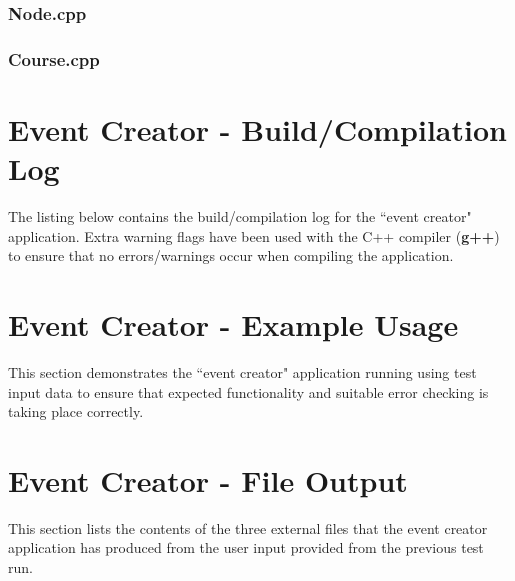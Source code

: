 \documentclass[a4paper, 10pt]{article}
\begin{document}
\clearpage
\subsubsection{Node.cpp}


\clearpage
\subsubsection{Course.cpp}


\clearpage
\section{Event Creator - Build/Compilation Log}

The listing below contains the build/compilation log for the ``event creator" application. Extra warning flags have been used with the C++ compiler (\textbf{g++}) to ensure that no errors/warnings occur when compiling the application.



\clearpage
\section{Event Creator - Example Usage}
This section demonstrates the ``event creator" application running using test input data to ensure that expected functionality and suitable error checking is taking place correctly.



\clearpage
\section{Event Creator - File Output}

This section lists the contents of the three external files that the event creator application has produced from the user input provided from the previous test run. 




\end{document}
